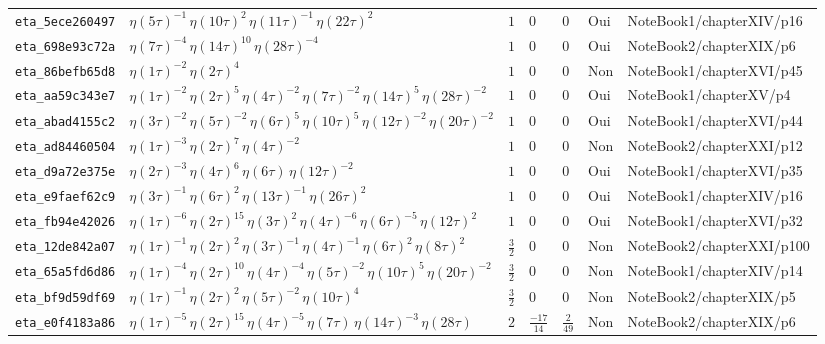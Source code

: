 \documentclass[11pt,twoside,openright]{book}
\begin{document}
\begin{longtable}{p{2.3cm}p{4.3cm}llllp{2.3cm}}
\texttt{eta\_5ece260497} & $\eta(5\tau)^{-1}\, \eta(10\tau)^{2}\, \eta(11\tau)^{-1}\, \eta(22\tau)^{2}$ & $1$ & $0$ & $0$ & Oui & NoteBook1/chapterXIV/p16 \\
\texttt{eta\_698e93c72a} & $\eta(7\tau)^{-4}\, \eta(14\tau)^{10}\, \eta(28\tau)^{-4}$ & $1$ & $0$ & $0$ & Oui & NoteBook2/chapterXIX/p6 \\
\texttt{eta\_86befb65d8} & $\eta(1\tau)^{-2}\, \eta(2\tau)^{4}$ & $1$ & $0$ & $0$ & Non & NoteBook1/chapterXVI/p45 \\
\texttt{eta\_aa59c343e7} & $\eta(1\tau)^{-2}\, \eta(2\tau)^{5}\, \eta(4\tau)^{-2}\, \eta(7\tau)^{-2}\, \eta(14\tau)^{5}\, \eta(28\tau)^{-2}$ & $1$ & $0$ & $0$ & Oui & NoteBook1/chapterXV/p4 \\
\texttt{eta\_abad4155c2} & $\eta(3\tau)^{-2}\, \eta(5\tau)^{-2}\, \eta(6\tau)^{5}\, \eta(10\tau)^{5}\, \eta(12\tau)^{-2}\, \eta(20\tau)^{-2}$ & $1$ & $0$ & $0$ & Oui & NoteBook1/chapterXVI/p44 \\
\texttt{eta\_ad84460504} & $\eta(1\tau)^{-3}\, \eta(2\tau)^{7}\, \eta(4\tau)^{-2}$ & $1$ & $0$ & $0$ & Non & NoteBook2/chapterXXI/p12 \\
\texttt{eta\_d9a72e375e} & $\eta(2\tau)^{-3}\, \eta(4\tau)^{6}\, \eta(6\tau)\, \eta(12\tau)^{-2}$ & $1$ & $0$ & $0$ & Oui & NoteBook1/chapterXVI/p35 \\
\texttt{eta\_e9faef62c9} & $\eta(3\tau)^{-1}\, \eta(6\tau)^{2}\, \eta(13\tau)^{-1}\, \eta(26\tau)^{2}$ & $1$ & $0$ & $0$ & Oui & NoteBook1/chapterXIV/p16 \\
\texttt{eta\_fb94e42026} & $\eta(1\tau)^{-6}\, \eta(2\tau)^{15}\, \eta(3\tau)^{2}\, \eta(4\tau)^{-6}\, \eta(6\tau)^{-5}\, \eta(12\tau)^{2}$ & $1$ & $0$ & $0$ & Oui & NoteBook1/chapterXVI/p32 \\
\texttt{eta\_12de842a07} & $\eta(1\tau)^{-1}\, \eta(2\tau)^{2}\, \eta(3\tau)^{-1}\, \eta(4\tau)^{-1}\, \eta(6\tau)^{2}\, \eta(8\tau)^{2}$ & $\frac{3}{2}$ & $0$ & $0$ & Non & NoteBook2/chapterXXI/p100 \\
\texttt{eta\_65a5fd6d86} & $\eta(1\tau)^{-4}\, \eta(2\tau)^{10}\, \eta(4\tau)^{-4}\, \eta(5\tau)^{-2}\, \eta(10\tau)^{5}\, \eta(20\tau)^{-2}$ & $\frac{3}{2}$ & $0$ & $0$ & Non & NoteBook1/chapterXIV/p14 \\
\texttt{eta\_bf9d59df69} & $\eta(1\tau)^{-1}\, \eta(2\tau)^{2}\, \eta(5\tau)^{-2}\, \eta(10\tau)^{4}$ & $\frac{3}{2}$ & $0$ & $0$ & Non & NoteBook2/chapterXIX/p5 \\
\texttt{eta\_e0f4183a86} & $\eta(1\tau)^{-5}\, \eta(2\tau)^{15}\, \eta(4\tau)^{-5}\, \eta(7\tau)\, \eta(14\tau)^{-3}\, \eta(28\tau)$ & $2$ & $\frac{-17}{14}$ & $\frac{2}{49}$ & Non & NoteBook2/chapterXIX/p6 \\

\end{longtable}
\end{document}
